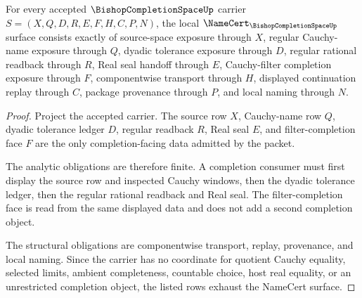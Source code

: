 \begin{theorem}
\label{thm:bishop-completion-space-namecert-obligations}
For every accepted $\BishopCompletionSpaceUp$ carrier $S=(X,Q,D,R,E,F,H,C,P,N)$, the local $\NameCert_{\BishopCompletionSpaceUp}$ surface consists exactly of source-space exposure through $X$, regular Cauchy-name exposure through $Q$, dyadic tolerance exposure through $D$, regular rational readback through $R$, Real seal handoff through $E$, Cauchy-filter completion exposure through $F$, componentwise transport through $H$, displayed continuation replay through $C$, package provenance through $P$, and local naming through $N$.
\end{theorem}
\begin{proof}
Project the accepted carrier. The source row $X$, Cauchy-name row $Q$, dyadic tolerance ledger $D$, regular readback $R$, Real seal $E$, and filter-completion face $F$ are the only completion-facing data admitted by the packet.

The analytic obligations are therefore finite. A completion consumer must first display the source row and inspected Cauchy windows, then the dyadic tolerance ledger, then the regular rational readback and Real seal. The filter-completion face is read from the same displayed data and does not add a second completion object.

The structural obligations are componentwise transport, replay, provenance, and local naming. Since the carrier has no coordinate for quotient Cauchy equality, selected limits, ambient completeness, countable choice, host real equality, or an unrestricted completion object, the listed rows exhaust the NameCert surface.
\end{proof}

